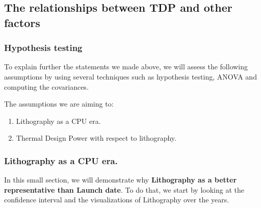 \subsection{The relationships between TDP and other factors}
\subsubsection{Hypothesis testing}
\label{section:data_analysis_anova}

To explain further the statements we made above, we will assess the following assumptions by using several techniques such as 
hypothesis testing, ANOVA and computing the covariances.

The assumptions we are aiming to:
\begin{enumerate}
    \item Lithography as a CPU era.
    \item Thermal Design Power with respect to lithography.
\end{enumerate}











\subsubsection{Lithography as a CPU era.\label{Litho era}}

In this small section, we will demonstrate why \textbf{Lithography as a better representative than Launch date}. To do that, we start by looking at the confidence interval and the visualizations of Lithography over the years.


